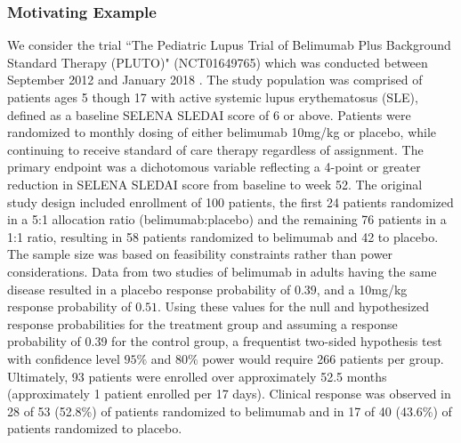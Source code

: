 \documentclass[12pt]{article}
\begin{document}
\subsubsection{Motivating Example}\label{sec:example2motivating}
We consider the trial ``The Pediatric Lupus Trial of Belimumab Plus Background Standard Therapy (PLUTO)" (NCT01649765) which was conducted between September 2012 and January 2018 \citep{Brunner2020}.
%
The study population was comprised of patients ages 5 though 17 with active systemic lupus erythematosus (SLE), defined as a baseline SELENA SLEDAI score of 6 or above.
%
Patients were randomized to monthly dosing of either belimumab 10mg/kg or placebo, while continuing to receive standard of care therapy regardless of assignment.
%
The primary endpoint was a dichotomous variable reflecting a 4-point or greater reduction in SELENA SLEDAI score from baseline to week 52. 
%
The original study design included enrollment of 100 patients, the first 24 patients randomized in a 5:1 allocation ratio (belimumab:placebo) and the remaining 76 patients in a 1:1 ratio, resulting in 58 patients randomized to belimumab and 42 to placebo. 
%
The sample size was based on feasibility constraints rather than power considerations.
%
Data from two studies of belimumab in adults having the same disease resulted in a placebo response probability of $0.39$, and a 10mg/kg response probability of $0.51$. 
%
Using these values for the null and hypothesized response probabilities for the treatment group and assuming a response probability of 0.39 for the control group, a frequentist two-sided hypothesis test with confidence level $95\%$ and $80\%$ power would require 266 patients per group.
%
Ultimately, 93 patients were enrolled over approximately 52.5 months (approximately 1 patient enrolled per 17 days).
%
Clinical response was observed in 28 of 53 (52.8\%) of patients randomized to belimumab and in 17 of 40 (43.6\%) of patients randomized to placebo.
\end{document}
